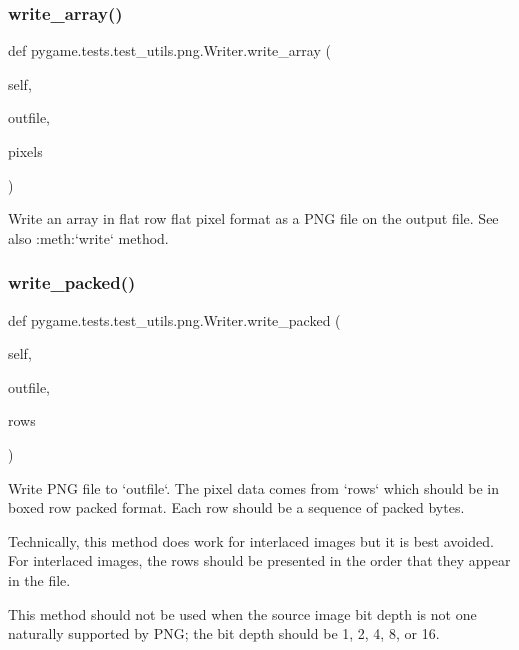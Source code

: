 \subsubsection{\texorpdfstring{write\+\_\+array()}{write\_array()}}
{\footnotesize\ttfamily def pygame.\+tests.\+test\+\_\+utils.\+png.\+Writer.\+write\+\_\+array (\begin{DoxyParamCaption}\item[{}]{self,  }\item[{}]{outfile,  }\item[{}]{pixels }\end{DoxyParamCaption})}

\begin{DoxyVerb}Write an array in flat row flat pixel format as a PNG file on
the output file.  See also :meth:`write` method.
\end{DoxyVerb}
 \mbox{\label{classpygame_1_1tests_1_1test__utils_1_1png_1_1_writer_ad24e0c033a1734f6da5560702b639429}} 
\subsubsection{\texorpdfstring{write\+\_\+packed()}{write\_packed()}}
{\footnotesize\ttfamily def pygame.\+tests.\+test\+\_\+utils.\+png.\+Writer.\+write\+\_\+packed (\begin{DoxyParamCaption}\item[{}]{self,  }\item[{}]{outfile,  }\item[{}]{rows }\end{DoxyParamCaption})}

\begin{DoxyVerb}Write PNG file to `outfile`.  The pixel data comes from `rows`
which should be in boxed row packed format.  Each row should be
a sequence of packed bytes.

Technically, this method does work for interlaced images but it
is best avoided.  For interlaced images, the rows should be
presented in the order that they appear in the file.

This method should not be used when the source image bit depth
is not one naturally supported by PNG; the bit depth should be
1, 2, 4, 8, or 16.
\end{DoxyVerb}
 \mbox{\label{classpygame_1_1tests_1_1test__utils_1_1png_1_1_writer_a1579d47dbdeb9352ecf83bb93b3a55dc}} 
